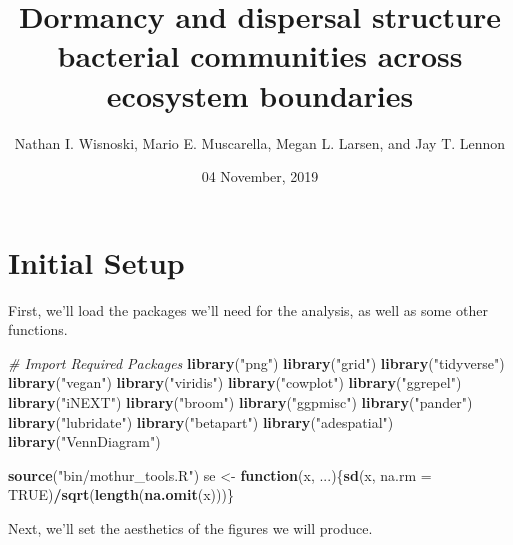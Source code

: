 \documentclass[]{article}
\title{Dormancy and dispersal structure bacterial communities across ecosystem
boundaries}
\author{Nathan I. Wisnoski, Mario E. Muscarella, Megan L. Larsen, and Jay T.
Lennon}
\date{04 November, 2019}
\newenvironment{Shaded}{\begin{snugshade}}{\end{snugshade}}
\newcommand{\CommentTok}[1]{\textcolor[rgb]{0.56,0.35,0.01}{\textit{#1}}}
\newcommand{\ControlFlowTok}[1]{\textcolor[rgb]{0.13,0.29,0.53}{\textbf{#1}}}
\newcommand{\DataTypeTok}[1]{\textcolor[rgb]{0.13,0.29,0.53}{#1}}
\newcommand{\KeywordTok}[1]{\textcolor[rgb]{0.13,0.29,0.53}{\textbf{#1}}}
\newcommand{\NormalTok}[1]{#1}
\newcommand{\OperatorTok}[1]{\textcolor[rgb]{0.81,0.36,0.00}{\textbf{#1}}}
\newcommand{\OtherTok}[1]{\textcolor[rgb]{0.56,0.35,0.01}{#1}}
\newcommand{\StringTok}[1]{\textcolor[rgb]{0.31,0.60,0.02}{#1}}
\begin{document}
\maketitle

\hypertarget{initial-setup}{%
\section{Initial Setup}\label{initial-setup}}

First, we'll load the packages we'll need for the analysis, as well as
some other functions.

\begin{Shaded}
\begin{Highlighting}[]
\CommentTok{# Import Required Packages}
\KeywordTok{library}\NormalTok{(}\StringTok{"png"}\NormalTok{)}
\KeywordTok{library}\NormalTok{(}\StringTok{"grid"}\NormalTok{)}
\KeywordTok{library}\NormalTok{(}\StringTok{"tidyverse"}\NormalTok{)   }
\KeywordTok{library}\NormalTok{(}\StringTok{"vegan"}\NormalTok{)}
\KeywordTok{library}\NormalTok{(}\StringTok{"viridis"}\NormalTok{)}
\KeywordTok{library}\NormalTok{(}\StringTok{"cowplot"}\NormalTok{)}
\KeywordTok{library}\NormalTok{(}\StringTok{"ggrepel"}\NormalTok{)}
\KeywordTok{library}\NormalTok{(}\StringTok{"iNEXT"}\NormalTok{)}
\KeywordTok{library}\NormalTok{(}\StringTok{"broom"}\NormalTok{)}
\KeywordTok{library}\NormalTok{(}\StringTok{"ggpmisc"}\NormalTok{)}
\KeywordTok{library}\NormalTok{(}\StringTok{"pander"}\NormalTok{)}
\KeywordTok{library}\NormalTok{(}\StringTok{"lubridate"}\NormalTok{)}
\KeywordTok{library}\NormalTok{(}\StringTok{"betapart"}\NormalTok{)}
\KeywordTok{library}\NormalTok{(}\StringTok{"adespatial"}\NormalTok{)}
\KeywordTok{library}\NormalTok{(}\StringTok{"VennDiagram"}\NormalTok{)}

\KeywordTok{source}\NormalTok{(}\StringTok{"bin/mothur_tools.R"}\NormalTok{)}
\NormalTok{se <-}\StringTok{ }\ControlFlowTok{function}\NormalTok{(x, ...)\{}\KeywordTok{sd}\NormalTok{(x, }\DataTypeTok{na.rm =} \OtherTok{TRUE}\NormalTok{)}\OperatorTok{/}\KeywordTok{sqrt}\NormalTok{(}\KeywordTok{length}\NormalTok{(}\KeywordTok{na.omit}\NormalTok{(x)))\}}
\end{Highlighting}
\end{Shaded}

Next, we'll set the aesthetics of the figures we will produce.
\end{document}

